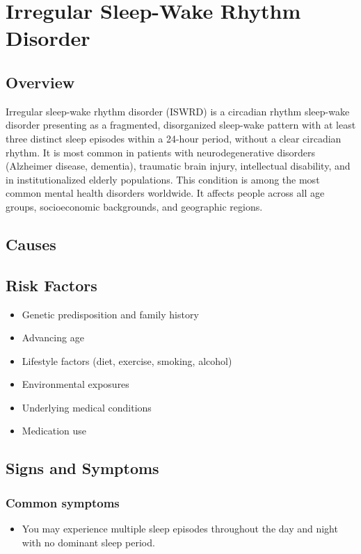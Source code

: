 \chapter{Irregular Sleep-Wake Rhythm Disorder}
\label{sec:Irregular Sleep-Wake Rhythm Disorder}

\section{Overview}
Irregular sleep-wake rhythm disorder (ISWRD) is a circadian rhythm sleep-wake disorder presenting as a fragmented, disorganized sleep-wake pattern with at least three distinct sleep episodes within a 24-hour period, without a clear circadian rhythm. It is most common in patients with neurodegenerative disorders (Alzheimer disease, dementia), traumatic brain injury, intellectual disability, and in institutionalized elderly populations. This condition is among the most common mental health disorders worldwide. It affects people across all age groups, socioeconomic backgrounds, and geographic regions.
\section{Causes}
\section{Risk Factors}

\begin{itemize}[noitemsep]
  \item Genetic predisposition and family history
  \item Advancing age
  \item Lifestyle factors (diet, exercise, smoking, alcohol)
  \item Environmental exposures
  \item Underlying medical conditions
  \item Medication use
\end{itemize}
\section{Signs and Symptoms}

\subsection{Common symptoms}
\begin{itemize}[noitemsep]
  \item You may experience multiple sleep episodes throughout the day and night with no dominant sleep period. 
  \end{itemize}

